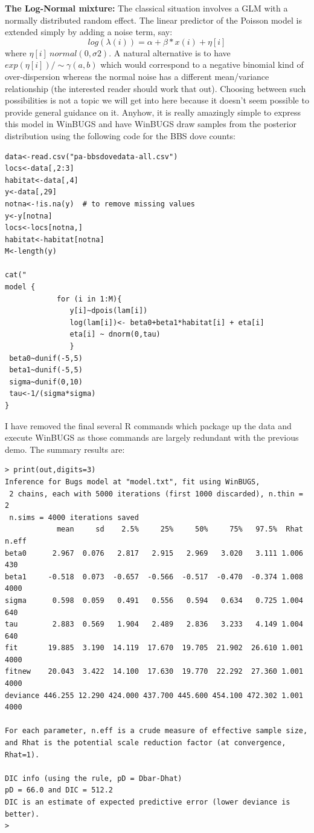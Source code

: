 {\bf The Log-Normal mixture:} The classical situation involves a GLM with a normally distributed random effect. The linear predictor of the Poisson model is extended simply by adding a noise term, say:
\[
 	log(\lambda(i)) = \alpha  + \beta*x(i) + \eta[i]
\]
where $\eta[i]~normal(0,\sigma2)$.  A natural alternative is to have $exp(\eta[i])/\sim\gamma(a,b)$ which would correspond to a negative binomial kind of over-dispersion whereas the normal noise has a different mean/variance relationship (the interested reader should work that out).   Choosing between such possibilities is not a topic we will get into here because it doesn't seem possible to provide general guidance on it. Anyhow, it is really amazingly simple to express this model in WinBUGS and have WinBUGS draw samples from the posterior distribution using the following code for the BBS dove counts: 
\begin{verbatim}
data<-read.csv("pa-bbsdovedata-all.csv")
locs<-data[,2:3]
habitat<-data[,4]
y<-data[,29]
notna<-!is.na(y)  # to remove missing values
y<-y[notna]
locs<-locs[notna,]
habitat<-habitat[notna]
M<-length(y)

cat("
model {
            for (i in 1:M){
               y[i]~dpois(lam[i])
               log(lam[i])<- beta0+beta1*habitat[i] + eta[i]
               eta[i] ~ dnorm(0,tau)
               }
 beta0~dunif(-5,5)
 beta1~dunif(-5,5)
 sigma~dunif(0,10)
 tau<-1/(sigma*sigma)
}
\end{verbatim}
I have removed the final several R commands which package up the data and execute WinBUGS as those commands are largely redundant with the previous demo.  The summary results are:
\begin{verbatim}
> print(out,digits=3)
Inference for Bugs model at "model.txt", fit using WinBUGS,
 2 chains, each with 5000 iterations (first 1000 discarded), n.thin = 2
 n.sims = 4000 iterations saved
            mean     sd    2.5%     25%     50%     75%   97.5%  Rhat n.eff
beta0      2.967  0.076   2.817   2.915   2.969   3.020   3.111 1.006   430
beta1     -0.518  0.073  -0.657  -0.566  -0.517  -0.470  -0.374 1.008  4000
sigma      0.598  0.059   0.491   0.556   0.594   0.634   0.725 1.004   640
tau        2.883  0.569   1.904   2.489   2.836   3.233   4.149 1.004   640
fit       19.885  3.190  14.119  17.670  19.705  21.902  26.610 1.001  4000
fitnew    20.043  3.422  14.100  17.630  19.770  22.292  27.360 1.001  4000
deviance 446.255 12.290 424.000 437.700 445.600 454.100 472.302 1.001  4000

For each parameter, n.eff is a crude measure of effective sample size,
and Rhat is the potential scale reduction factor (at convergence, Rhat=1).

DIC info (using the rule, pD = Dbar-Dhat)
pD = 66.0 and DIC = 512.2
DIC is an estimate of expected predictive error (lower deviance is better).
> 

\end{verbatim}

